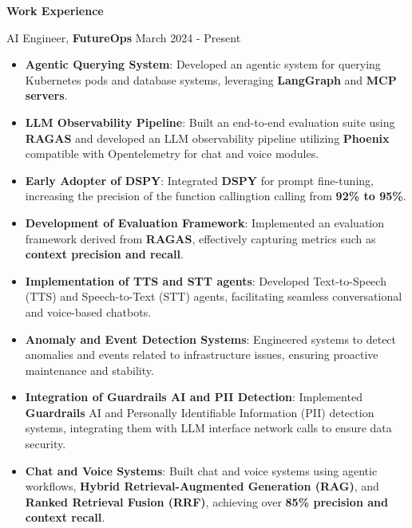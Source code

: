 \documentclass{article}%
\begin{document}
\vspace{2mm}
\begin{flushleft}
\bf{\Large{Work Experience}}
\end{flushleft}
\vspace{-2mm}
\hline
\vspace{2mm}
AI Engineer, \textbf {FutureOps} \hfill{March 2024 - Present}
\vspace{-1mm}
\begin{itemize}
\setlength\itemsep{0.01em}
\item \textbf{Agentic Querying System}: Developed an agentic system for querying Kubernetes pods and database systems, leveraging \textbf{LangGraph} and \textbf{MCP servers}.
\item \textbf{LLM Observability Pipeline}: Built an end-to-end evaluation suite using \textbf{RAGAS} and developed an LLM observability pipeline utilizing \textbf{Phoenix} compatible with Opentelemetry for chat and voice modules.
\item \textbf{Early Adopter of DSPY}: Integrated \textbf{DSPY} for prompt fine-tuning, increasing the precision of the function callingtion calling from\textbf{ 92\% to 95\%}.
    \item \textbf{Development of Evaluation Framework}: Implemented an evaluation framework derived from \textbf{RAGAS}, effectively capturing metrics such as \textbf{context precision and recall}.
    \item \textbf{Implementation of TTS and STT agents}: Developed Text-to-Speech (TTS) and Speech-to-Text (STT) agents, facilitating seamless conversational and voice-based chatbots.
    \item \textbf{Anomaly and Event Detection Systems}: Engineered systems to detect anomalies and events related to infrastructure issues, ensuring proactive maintenance and stability.
    \item \textbf{Integration of Guardrails AI and PII Detection}: Implemented \textbf{Guardrails} AI and Personally Identifiable Information (PII) detection systems, integrating them with LLM interface network calls to ensure data security.
    \item \textbf{Chat and Voice Systems}: Built chat and voice systems using agentic workflows, \textbf{Hybrid Retrieval-Augmented Generation (RAG)}, and \textbf{Ranked Retrieval Fusion (RRF)}, achieving over \textbf{85\% precision and context recall}.
\end{itemize}
\vspace{-1mm}
\end{document}
